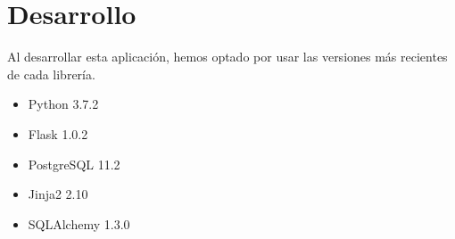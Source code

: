 \chapter{Desarrollo\label{CAP:DESARROLLO}}
  Al desarrollar esta aplicación, hemos optado por usar las versiones más recientes de cada librería.
  \begin{itemize}
    \item Python 3.7.2
    \item Flask 1.0.2
    \item PostgreSQL 11.2
    \item Jinja2 2.10
    \item SQLAlchemy 1.3.0 
  \end{itemize}